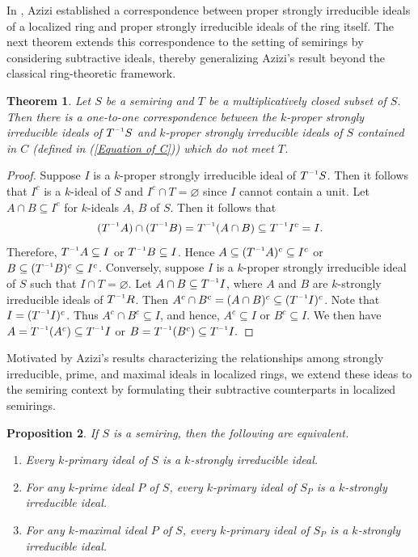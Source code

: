 \documentclass[11pt,english]{amsart}
\newcommand{\inv}{^{\raisebox{.2ex}{$\scriptscriptstyle-1$}}}
\newtheorem{theorem}{Theorem}[section]
\newtheorem{proposition}[theorem]{Proposition}
\theoremstyle{definition}
\numberwithin{equation}{section}
\begin{document}
In \cite[Theorem 3.1]{Azizi08}, Azizi established a correspondence between proper strongly irreducible ideals of a localized ring and proper strongly irreducible ideals of the ring itself. The next theorem extends this correspondence to the setting of semirings by considering subtractive ideals, thereby generalizing Azizi's result beyond the classical ring-theoretic framework.
\begin{theorem} \label{loc}
Let $S$  be a semiring and $T$ be a multiplicatively closed subset of $S$. Then
there is a one-to-one correspondence between the $k$-proper strongly irreducible ideals of $T\inv{S}$ 
and $k$-proper strongly irreducible ideals of $S$  contained in $C$ (defined in (\ref{Equation of C})) which do not meet $T$.
\end{theorem}

\begin{proof}
    Suppose $I$ is a  $k$-proper strongly irreducible ideal of $T\inv S$. Then it follows that $I^c$ is a $k$-ideal of $S$ and $I^c \cap T=\varnothing $ since $I$ cannot contain a unit. Let $A \cap B \subseteq I^c$ for $k$-ideals $A$, $B$ of $S$. Then it follows that \[(T\inv A) \cap (T\inv B) =T\inv (A\cap B) \subseteq T\inv I^c =I.\] Therefore, $T\inv A \subseteq I$ or $T\inv B \subseteq I$. Hence $A\subseteq (T\inv A)^c \subseteq I^c$ or $B\subseteq (T\inv B)^c \subseteq I^c$. 
    Conversely, suppose $I$ is a $k$-proper strongly irreducible ideal of $S$ such that $I \cap T =\varnothing $.  Let $A \cap B \subseteq T\inv I$, where $A$ and $B$ are $k$-strongly irreducible ideals of $T\inv R$. Then $A^c \cap B^c =(A \cap B)^c \subseteq (T\inv I)^c$. Note that $I=(T\inv I)^c $. Thus $A^c \cap B^c \subseteq I$, and hence, $A^c \subseteq I$ or $B^c \subseteq I$. We then have $A=T\inv (A^c) \subseteq  T\inv I$ or $B=T\inv(B^c) \subseteq T\inv I.$
\end{proof}

Motivated by Azizi's results \cite[Theorem 3.4]{Azizi08} characterizing the relationships among strongly irreducible, prime, and maximal ideals in localized rings, we extend these ideas to the semiring context by formulating their subtractive counterparts in localized semirings.

\begin{proposition}
 If $S$ is a semiring, then the following are equivalent.
\begin{enumerate}
\item  Every $k$-primary ideal of $S$ is a $k$-strongly irreducible ideal.

\item For any $k$-prime ideal $P$ of $S$, every $k$-primary ideal of $S_P$ is a $k$-strongly irreducible
ideal.

\item For any $k$-maximal ideal $P$ of $S$, every $k$-primary ideal of $S_P$ is a $k$-strongly irreducible
ideal.
\end{enumerate}
\end{proposition}
\end{document}
